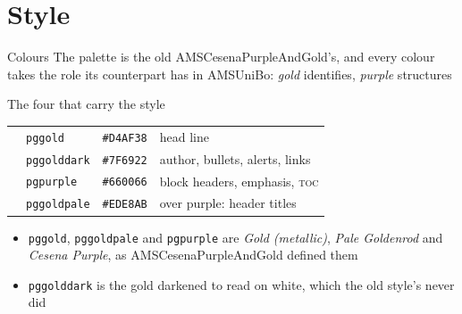 \documentclass[presentation,cesena,apice]{beamer}\mode<presentation>{\usetheme{AMSPurpleAndGold}}
\newcommand{\swatch}[1]{\fcolorbox{pggreyline}{#1}{\rule{0pt}{1.3ex}\rule{2.2ex}{0pt}}}
\begin{document}
\section{Style}

\begin{frame}[c,fragile]{Colours}
%
The palette is the old \alert{AMSCesenaPurpleAndGold}'s, and every colour takes the
role its counterpart has in \alert{AMSUniBo}: \textcolor{pggolddark}{\textit{gold}} identifies,
\textcolor{pgpurple}{\textit{purple}} structures
%
\begin{exampleblock}{The four that carry the style}
\begin{tabular}{@{}llll@{}}
\swatch{pggold}     & \texttt{pggold}     & \texttt{\#D4AF38} & head line \\
\swatch{pggolddark} & \texttt{pggolddark} & \texttt{\#7F6922} & author, bullets, alerts, links \\
\swatch{pgpurple}   & \texttt{pgpurple}   & \texttt{\#660066} & block headers, emphasis, \textsc{toc} \\
\swatch{pggoldpale} & \texttt{pggoldpale} & \texttt{\#EDE8AB} & over purple: header titles \\
\end{tabular}
\end{exampleblock}
%
\begin{itemize}
	\item \texttt{pggold}, \texttt{pggoldpale} and \texttt{pgpurple} are \emph{Gold (metallic)},
	      \emph{Pale Goldenrod} and \emph{Cesena Purple}, as \alert{AMSCesenaPurpleAndGold} defined them
	\item \texttt{pggolddark} is the gold darkened to read on white, which the old style's never did
\end{itemize}
%
\end{frame}
\end{document}
